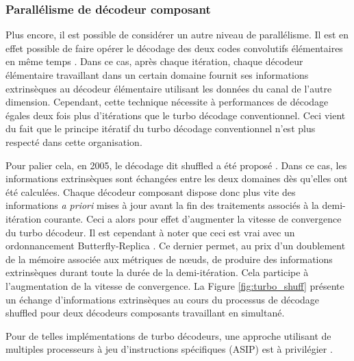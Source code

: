 \subsubsection{Parallélisme de décodeur composant}
Plus encore, il est possible de considérer un autre niveau de parallélisme. Il est en effet possible de faire opérer le 
décodage des deux codes convolutifs élémentaires en même temps \cite{turbo_par}. Dans ce cas, après chaque itération, 
chaque décodeur élémentaire travaillant dans un certain domaine fournit ses informations extrinsèques au décodeur 
élémentaire utilisant les données du canal de l'autre dimension. Cependant, cette technique nécessite à performances de 
décodage égales deux fois plus d'itérations que le turbo décodage conventionnel. Ceci vient du fait que le principe 
itératif du turbo décodage conventionnel n'est plus respecté dans cette organisation.

Pour palier cela, en 2005, le décodage dit shuffled a été proposé \cite{turbo_shuff}. Dans ce cas,  les informations extrinsèques sont échangées entre les deux domaines dès qu'elles ont 
été calculées. Chaque décodeur composant dispose donc plus vite des informations \textit{a priori} mises à jour avant la 
fin des traitements associés à la demi-itération courante. Ceci a 
alors pour effet d'augmenter la vitesse de convergence du turbo décodeur. 
Il est cependant à noter que ceci est 
vrai avec un ordonnancement Butterfly-Replica \cite{butt_replica}. Ce dernier permet, au prix d'un doublement de 
la mémoire associée aux métriques de nœuds, de produire des informations extrinsèques durant toute la durée de la demi-itération. 
Cela participe à l'augmentation de la vitesse de convergence.
La Figure \ref{fig:turbo_shuff} présente un échange d'informations extrinsèques au cours du processus de décodage 
shuffled pour deux décodeurs composants travaillant en simultané.

Pour de telles implémentations de turbo décodeurs, une approche utilisant de multiples processeurs à jeu d’instructions 
spécifiques (ASIP) est à privilégier \cite{asip}.

